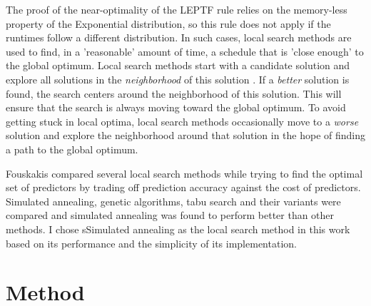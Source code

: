 \documentclass[12pt]{report}
\begin{document}
The proof of the near-optimality of the LEPTF rule relies on the memory-less property of the Exponential distribution, so this rule does not apply if the runtimes follow a different distribution.
In such cases, local search methods are used to find, in a 'reasonable' amount of time, a schedule that is 'close enough' to the global optimum.
Local search methods start with a candidate solution and explore all solutions in the \textit{neighborhood} of this solution \cite{Glass1994}.
If a \textit{better} solution is found, the search centers around the neighborhood of this solution.
This will ensure that the search is always moving toward the global optimum.
To avoid getting stuck in local optima, local search methods occasionally move to a \textit{worse} solution and explore the neighborhood around that solution in the hope of finding a path to the global optimum.

Fouskakis \cite{Fouskakis2001} compared several local search methods while trying to find the optimal set of predictors by trading off prediction accuracy against the cost of predictors. 
Simulated annealing, genetic algorithms, tabu search and their variants were compared and simulated annealing was found to perform better than other methods.
I chose sSimulated annealing as the local search method in this work based on its performance and the simplicity of its implementation.

\section{Method}
\end{document}
